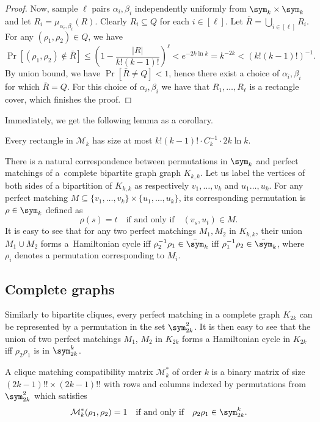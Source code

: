\begin{proof}
    Now, sample $\ell$ pairs $\alpha_i, \beta_i$ independently uniformly from $\sym_k \times \sym_k$ and let $R_i = \mu_{\alpha_i, \beta_i}(R)$. Clearly $R_i \subseteq Q$ for each $i \in [\ell]$. Let $\bar{R} = \bigcup_{i \in [\ell]} R_i$. For any $(\rho_1, \rho_2) \in Q$, we have
    $$
    \Pr\left[(\rho_1, \rho_2) \not\in \bar{R}\right] \leq \left(1 - \frac{|R|}{k!(k - 1)!} \right)^{\ell} < e^{-2k \ln k} = k^{-2k} < (k!(k - 1)!)^{-1}.
    $$
    By union bound, we have
    $
    \Pr \left[ \bar{R} \neq Q \right] < 1
    $,
    hence there exist a choice of $\alpha_i, \beta_i$ for which $\bar{R} = Q$. For this choice of $\alpha_i,\beta_i$ we have that $R_1,\ldots,R_\ell$ is a rectangle cover, which finishes the proof.
\end{proof}


Immediately, we get the following lemma as a corollary.

\begin{lemma}\label{lem:mm_size_bound}
    Every rectangle in $\mathcal{M}_k$ has size at most
    $k!(k-1)! \cdot C_k^{-1} \cdot 2k \ln k$.
\end{lemma}


There is a natural correspondence between permutations in $\sym_k$ and perfect matchings of a~complete bipartite graph graph $K_{k, k}$. Let us label the vertices of both sides of a bipartition of $K_{k, k}$ as respectively $v_1, \dots, v_k$ and $u_1 \dots, u_k$. For any perfect matching $M \subseteq \{v_1, \dots, v_k\} \times \{u_1, \dots, u_k\}$, its corresponding permutation is $\rho \in \sym_k$ defined as
$$
    \rho(s) = t \quad \text{if and only if} \quad (v_s, u_t) \in M.
$$
It is easy to see that for any two perfect matchings $M_1, M_2$ in $K_{k, k}$, their union $M_1 \cup M_2$ forms a~Hamiltonian cycle iff $\rho_2^{-1} \rho_1 \in \bar\sym_k$ iff $\rho_1^{-1} \rho_2 \in \bar\sym_k$, where $\rho_i$ denotes a permutation corresponding to $M_i$.


\subsection{Complete graphs} \label{sec:mm*}

Similarly to bipartite cliques, every perfect matching in a complete graph $K_{2k}$ can be represented by a permutation in the set $\sym_{2k}^2$. It is then easy to see that the union of two perfect matchings $M_1$, $M_2$ in $K_{2k}$ forms a Hamiltonian cycle in $K_{2k}$ iff $\rho_2 \rho_1$ is in $\sym_{2k}^k$.

\begin{definition}
    A clique matching compatibility matrix $\mathcal{M}^*_k$ of order $k$ is a binary matrix of size $(2k - 1)!! \times (2k - 1)!!$ with rows and columns indexed by permutations from $\sym_{2k}^2$ which satisfies
    $$
        \mathcal{M}^*_k(\rho_1, \rho_2) = 1 \quad \text{if and only if} \quad
        \rho_2 \rho_1 \in \sym_{2k}^k.
    $$
\end{definition}

